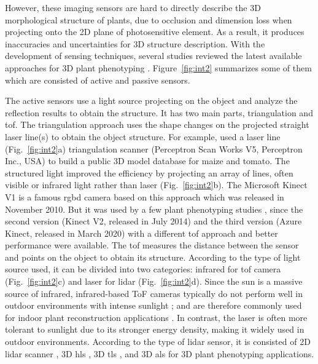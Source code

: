 However, these imaging sensors are hard to directly describe the 3D morphological structure of plants, due to occlusion and dimension loss when projecting onto the 2D plane of photosensitive element. As a result, it produces inaccuracies and uncertainties for 3D structure description. With the development of sensing techniques, several studies reviewed the latest available approaches for 3D plant phenotyping \citep{paulus_measuring_2019, okura_3d_2022, kochi_introduction_2021}. Figure~\ref{fig:int2} summarizes some of them which are consisted of active and passive sensors.



The active sensors use a light source projecting on the object and analyze the reflection results to obtain the structure. It has two main parts, triangulation and \gls{tof}. The triangulation approach uses the shape changes on the projected straight laser line(s) to obtain the object structure. For example, \citet[Figure~3]{schunck_pheno4d_2021} used a laser line (Fig.~\ref{fig:int2}a) triangulation scanner (Perceptron Scan Works V5, Perceptron Inc., USA) to build a public 3D model database for maize and tomato. The structured light improved the efficiency by projecting an array of lines, often visible or infrared light rather than laser (Fig.~\ref{fig:int2}b). The Microsoft Kinect V1 is a famous \gls{rgbd} camera based on this approach which was released in November 2010. But it was used by a few plant phenotyping studies \citep{nguyen_structured_2015}, since the second version (Kinect V2, released in July 2014) and the third version (Azure Kinect, released in March 2020) with a different \gls{tof} approach and better performance \citep{tolgyessy_evaluation_2021, lachat_assessment_2015} were available. The \acrfull{tof} measures the distance between the sensor and points on the object to obtain its structure. According to the type of light source used, it can be divided into two categories: infrared for \gls{tof} camera (Fig.~\ref{fig:int2}c) and laser for \gls{lidar} (Fig.~\ref{fig:int2}d). Since the sun is a massive source of infrared, infrared-based ToF cameras typically do not perform well in outdoor environments with intense sunlight \citep{tolgyessy_evaluation_2021}; and are therefore commonly used for indoor plant reconstruction applications \citep{martinez_low_2019, zhang_3d_2020, xu_global_2023}. In contrast, the laser is often more tolerant to sunlight due to its stronger energy density, making it widely used in outdoor environments. According to the type of \gls{lidar} sensor, it is consisted of 2D \gls{lidar} scanner \citep{garrido_3d_2015}, 3D \gls{hls} \citep{ma_calculation_2019}, 3D \gls{tls} \citep{wu_accurate_2019, su_estimation_2018, qiu_field-based_2019}, and 3D \gls{als} \citep{ten_biomass_2019, nguyen_uav_2023} for 3D plant phenotyping applications.

